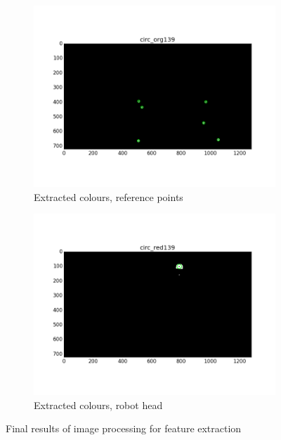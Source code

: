 \begin{figure}[htb]
	\begin{subfigure}[b]{0.49\linewidth}
        \centering
		\includegraphics[width=\linewidth]{files/_circ_org139.png}
		\caption{Extracted colours, reference points}
		\label{fig:circ_org}
	\end{subfigure}
	\begin{subfigure}[b]{0.49\linewidth}
        \centering
		\includegraphics[width=\linewidth]{files/_circ_red139.png}
		\caption{Extracted colours, robot head}
		\label{fig:circ_red}
	\end{subfigure}
	\caption{Final results of image processing for feature extraction} 
\end{figure}


